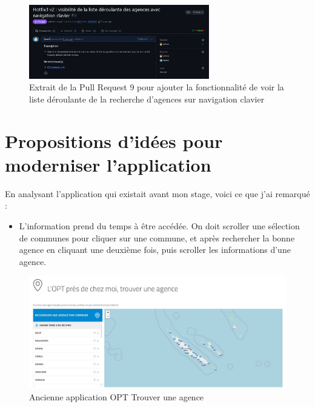 \documentclass[12pt,a4paper]{report}
\begin{document}
\begin{figure}[h] %
    \centering
    \includegraphics[width=0.7\textwidth]{ressources_rapport/extrait_pr_9.JPG}
    \caption{Extrait de la Pull Request 9 pour ajouter la fonctionnalité de voir la liste déroulante de la recherche d'agences sur navigation clavier}
\end{figure}
\newpage

\section{Propositions d'idées pour moderniser l'application}
En analysant l'application qui existait avant mon stage, voici ce que j'ai remarqué :
\begin{itemize}
    \item L'information prend du temps à être accédée. On doit scroller une sélection de communes pour cliquer sur une commune, et après rechercher la bonne agence en cliquant une deuxième fois, puis scroller les informations d'une agence.
\end{itemize}
\begin{figure}[h] %
    \centering
    \includegraphics[width=1\textwidth]{ressources_rapport/ancien_app_opt.JPG}
    \caption{Ancienne application OPT Trouver une agence}
\end{figure}
\vspace{1cm}
\end{document}
